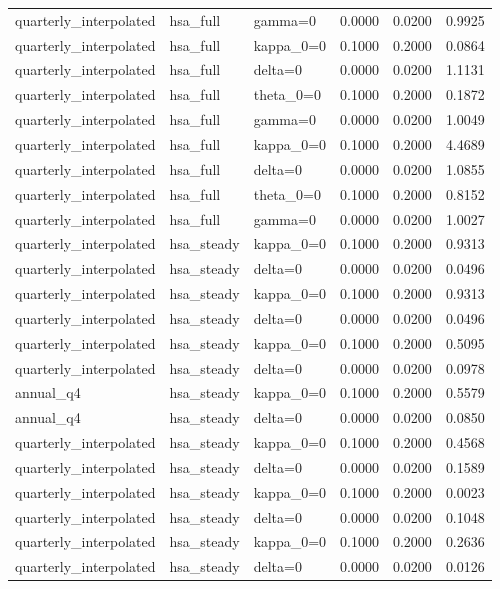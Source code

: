 \begin{tabular}{lllrrr}
quarterly\_interpolated & hsa\_full & gamma=0 & 0.0000 & 0.0200 & 0.9925 \\
quarterly\_interpolated & hsa\_full & kappa\_0=0 & 0.1000 & 0.2000 & 0.0864 \\
quarterly\_interpolated & hsa\_full & delta=0 & 0.0000 & 0.0200 & 1.1131 \\
quarterly\_interpolated & hsa\_full & theta\_0=0 & 0.1000 & 0.2000 & 0.1872 \\
quarterly\_interpolated & hsa\_full & gamma=0 & 0.0000 & 0.0200 & 1.0049 \\
quarterly\_interpolated & hsa\_full & kappa\_0=0 & 0.1000 & 0.2000 & 4.4689 \\
quarterly\_interpolated & hsa\_full & delta=0 & 0.0000 & 0.0200 & 1.0855 \\
quarterly\_interpolated & hsa\_full & theta\_0=0 & 0.1000 & 0.2000 & 0.8152 \\
quarterly\_interpolated & hsa\_full & gamma=0 & 0.0000 & 0.0200 & 1.0027 \\
quarterly\_interpolated & hsa\_steady & kappa\_0=0 & 0.1000 & 0.2000 & 0.9313 \\
quarterly\_interpolated & hsa\_steady & delta=0 & 0.0000 & 0.0200 & 0.0496 \\
quarterly\_interpolated & hsa\_steady & kappa\_0=0 & 0.1000 & 0.2000 & 0.9313 \\
quarterly\_interpolated & hsa\_steady & delta=0 & 0.0000 & 0.0200 & 0.0496 \\
quarterly\_interpolated & hsa\_steady & kappa\_0=0 & 0.1000 & 0.2000 & 0.5095 \\
quarterly\_interpolated & hsa\_steady & delta=0 & 0.0000 & 0.0200 & 0.0978 \\
annual\_q4 & hsa\_steady & kappa\_0=0 & 0.1000 & 0.2000 & 0.5579 \\
annual\_q4 & hsa\_steady & delta=0 & 0.0000 & 0.0200 & 0.0850 \\
quarterly\_interpolated & hsa\_steady & kappa\_0=0 & 0.1000 & 0.2000 & 0.4568 \\
quarterly\_interpolated & hsa\_steady & delta=0 & 0.0000 & 0.0200 & 0.1589 \\
quarterly\_interpolated & hsa\_steady & kappa\_0=0 & 0.1000 & 0.2000 & 0.0023 \\
quarterly\_interpolated & hsa\_steady & delta=0 & 0.0000 & 0.0200 & 0.1048 \\
quarterly\_interpolated & hsa\_steady & kappa\_0=0 & 0.1000 & 0.2000 & 0.2636 \\
quarterly\_interpolated & hsa\_steady & delta=0 & 0.0000 & 0.0200 & 0.0126 \\

\end{tabular}
